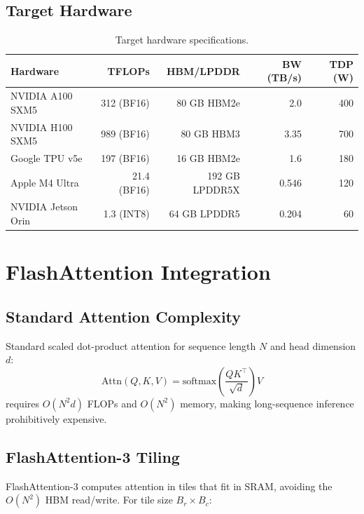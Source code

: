 \documentclass[11pt,a4paper]{article}
\begin{document}
\subsection{Target Hardware}

\begin{table}[H]
\centering
\caption{Target hardware specifications.}
\begin{tabular}{lrrrr}
\toprule
\textbf{Hardware} & \textbf{TFLOPs} & \textbf{HBM/LPDDR} & \textbf{BW (TB/s)} & \textbf{TDP (W)} \\
\midrule
NVIDIA A100 SXM5 & 312 (BF16) & 80 GB HBM2e & 2.0 & 400 \\
NVIDIA H100 SXM5 & 989 (BF16) & 80 GB HBM3  & 3.35 & 700 \\
Google TPU v5e   & 197 (BF16) & 16 GB HBM2e & 1.6 & 180 \\
Apple M4 Ultra   & 21.4 (BF16) & 192 GB LPDDR5X & 0.546 & 120 \\
NVIDIA Jetson Orin & 1.3 (INT8) & 64 GB LPDDR5 & 0.204 & 60 \\
\bottomrule
\end{tabular}
\label{tab:hardware}
\end{table}

\section{FlashAttention Integration}
\label{sec:flash_attention}

\subsection{Standard Attention Complexity}

Standard scaled dot-product attention for sequence length $N$ and head dimension $d$:
\begin{equation}
    \text{Attn}(Q, K, V) = \text{softmax}\!\left(\frac{QK^\top}{\sqrt{d}}\right) V
    \label{eq:attention}
\end{equation}
requires $O(N^2 d)$ FLOPs and $O(N^2)$ memory, making long-sequence inference
prohibitively expensive.

\subsection{FlashAttention-3 Tiling}

FlashAttention-3 \cite{shah2024flashattention3} computes attention in tiles that fit in
SRAM, avoiding the $O(N^2)$ HBM read/write. For tile size $B_r \times B_c$:
\end{document}
